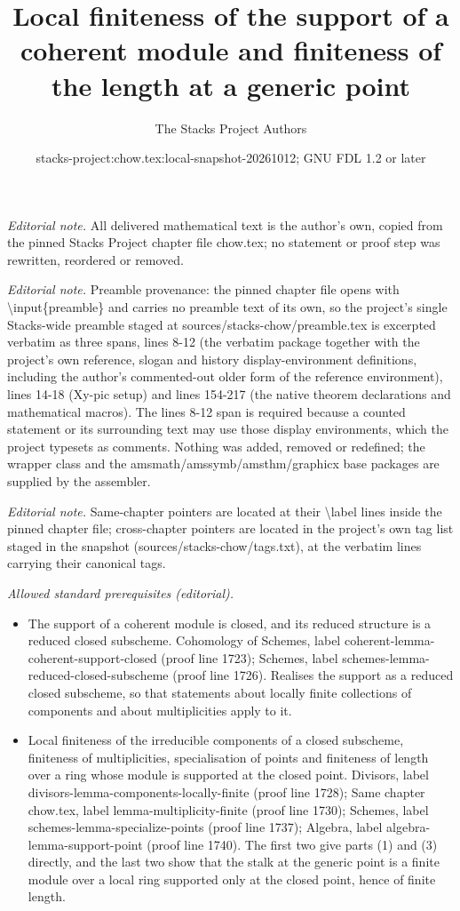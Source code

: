 \documentclass[10pt,a4paper]{amsart}
\title{Local finiteness of the support of a coherent module and finiteness of the length at a generic point}
\author{The Stacks Project Authors}
\date{stacks-project:chow.tex:local-snapshot-20261012; GNU FDL 1.2 or later}
\theoremstyle{plain}
\theoremstyle{definition}
\theoremstyle{remark}
\numberwithin{equation}{subsection}
\begin{document}
\maketitle
\noindent\textit{Editorial note.} All delivered mathematical text is the author's own, copied from the pinned Stacks Project chapter file chow.tex; no statement or proof step was rewritten, reordered or removed.\par\medskip
\noindent\textit{Editorial note.} Preamble provenance: the pinned chapter file opens with \textbackslash{}input\{preamble\} and carries no preamble text of its own, so the project's single Stacks-wide preamble staged at sources/stacks-chow/preamble.tex is excerpted verbatim as three spans, lines 8-12 (the verbatim package together with the project's own reference, slogan and history display-environment definitions, including the author's commented-out older form of the reference environment), lines 14-18 (Xy-pic setup) and lines 154-217 (the native theorem declarations and mathematical macros). The lines 8-12 span is required because a counted statement or its surrounding text may use those display environments, which the project typesets as comments. Nothing was added, removed or redefined; the wrapper class and the amsmath/amssymb/amsthm/graphicx base packages are supplied by the assembler.\par\medskip
\noindent\textit{Editorial note.} Same-chapter pointers are located at their \textbackslash{}label lines inside the pinned chapter file; cross-chapter pointers are located in the project's own tag list staged in the snapshot (sources/stacks-chow/tags.txt), at the verbatim lines carrying their canonical tags.\par\medskip
\noindent\textit{Allowed standard prerequisites (editorial).}\begin{itemize}
\item The support of a coherent module is closed, and its reduced structure is a reduced closed subscheme. Cohomology of Schemes, label coherent-lemma-coherent-support-closed (proof line 1723); Schemes, label schemes-lemma-reduced-closed-subscheme (proof line 1726). Realises the support as a reduced closed subscheme, so that statements about locally finite collections of components and about multiplicities apply to it.
\item Local finiteness of the irreducible components of a closed subscheme, finiteness of multiplicities, specialisation of points and finiteness of length over a ring whose module is supported at the closed point. Divisors, label divisors-lemma-components-locally-finite (proof line 1728); Same chapter chow.tex, label lemma-multiplicity-finite (proof line 1730); Schemes, label schemes-lemma-specialize-points (proof line 1737); Algebra, label algebra-lemma-support-point (proof line 1740). The first two give parts (1) and (3) directly, and the last two show that the stalk at the generic point is a finite module over a local ring supported only at the closed point, hence of finite length.
\end{itemize}\medskip
\end{document}
